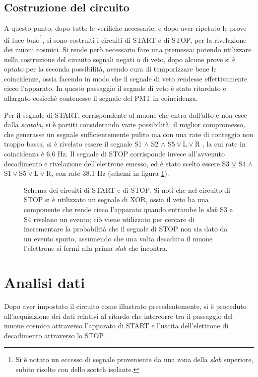 \documentclass[11pt, oneside, a4paper]{article}   	%
\begin{document}
\subsection{Costruzione del circuito}
A questo punto, dopo tutte le verifiche necessarie, e dopo aver ripetuto le prove di luce-buio\footnote{Si è notato un eccesso di segnale proveniente da una zona della \emph{slab} superiore, subito risolto con dello scotch isolante.}, si sono costruiti i circuiti di START e di STOP, per la rivelazione dei muoni cosmici. Si rende però necessario fare una premessa: potendo utilizzare nella costruzione del circuito segnali negati o di veto, dopo alcune prove si è optato per la seconda possibilità, avendo cura di temporizzare bene le coincidenze, ossia facendo in modo che il segnale di veto rendesse effettivamente cieco l'apparato. In questo passaggio il segnale di veto è stato ritardato e allargato cosicchè contenesse il segnale del PMT in coincidenza.

Per il segnale di START, corrispondente al muone che entra dall'alto e non esce dalla \emph{scatola}, si è partiti considerando varie possibilità; il miglior compromesso, che generasse un segnale sufficientemente pulito ma con una rate di conteggio non troppo bassa, si è rivelato essere il segnale S1 $\wedge$ S2  $\wedge$ $\overline{\mbox{S5}\vee \mbox{L} \vee \mbox{R}}$ , la cui rate in coincidenza è 6.6 Hz.
Il segnale di STOP corrisponde invece all'avvenuto decadimento e rivelazione dell'elettrone emesso, ed è stato scelto essere S3 $\veebar$ S4  $\wedge$ $\overline{\mbox{S1} \vee \mbox{S5}\vee \mbox{L} \vee \mbox{R}}$, con rate 38.1 Hz (schemi in figura \ref{scemi}).

\begin{figure}[H]
	\centering
	
	\caption{Schema dei circuiti di START e di STOP. Si noti che nel circuito di STOP si è utilizzato un segnale di XOR, ossia il veto ha una componente che rende cieco l'apparato quando entrambe le \emph{slab} S3 e S4 rivelano un evento; ciò viene utilizzato per cercare di incrementare la probabilità che il segnale di STOP non sia dato da un evento spurio, assumendo che una volta decaduto il muone l'elettrone si fermi alla prima \emph{slab} che incontra.}
	\label{scemi}
\end{figure}

\section{Analisi dati}
Dopo aver impostato il circuito come illustrato precedentemente, si è proceduto all'acquisizione dei dati relativi al ritardo che intercorre tra il passaggio del muone cosmico attraverso l'apparato di START e l'uscita dell'elettrone di decadimento attraverso lo STOP.
\end{document}
